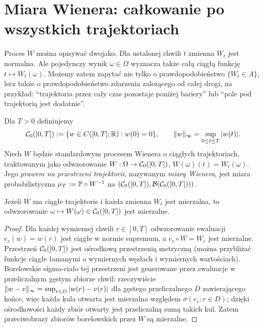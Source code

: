 \section{Miara Wienera: całkowanie po wszystkich trajektoriach}
Proces $W$ można opisywać dwojako. Dla ustalonej chwili $t$
zmienna $W_t$ jest normalna. Ale pojedynczy wynik
$\omega\in\Omega$ wyznacza także całą ciągłą funkcję
$t\mapsto W_t(\omega)$. Możemy zatem zapytać nie tylko
o prawdopodobieństwo $\{W_t\in A\}$, lecz także o
prawdopodobieństwo zdarzenia zależącego od całej drogi,
na przykład: ``trajektoria przez cały czas pozostaje
poniżej bariery'' lub ``pole pod trajektorią jest dodatnie''.

\begin{definicja}
Dla $T>0$ definiujemy
\[
\mathcal{C}_0([0,T]):=\{w\in C([0,T];\mathbb{R}):w(0)=0\},
\qquad \lVert w\rVert_\infty=\sup_{0\le t\le T}|w(t)|.
\]
Niech $W$ będzie standardowym procesem Wienera o ciągłych
trajektoriach, traktowanym jako odwzorowanie
$W:\Omega\to\mathcal{C}_0([0,T])$,
$W(\omega)(t)=W_t(\omega)$.
Jego \emph{prawem na przestrzeni trajektorii}, nazywanym
\emph{miarą Wienera}, jest miara probabilistyczna
$\mu_T:=\mathbb{P}\circ W^{-1}$ na
$(\mathcal{C}_0([0,T]),\mathcal{B}(\mathcal{C}_0([0,T])))$.
\end{definicja}

\begin{stwierdzenie}
Jeżeli $W$ ma ciągłe trajektorie i każda zmienna $W_t$
jest mierzalna, to odwzorowanie
$\omega\mapsto W(\omega)\in\mathcal{C}_0([0,T])$ jest mierzalne.
\end{stwierdzenie}
\begin{proof}
Dla każdej wymiernej chwili $r\in[0,T]$ odwzorowanie
ewaluacji $e_r(w)=w(r)$ jest ciągłe w normie supremum,
a $e_r\circ W=W_r$ jest mierzalne.
Przestrzeń $\mathcal{C}_0([0,T])$ jest ośrodkową przestrzenią
metryczną (można przybliżać funkcje ciągłe łamanymi
o wymiernych węzłach i wymiernych wartościach).
Borelowskie sigma-ciało tej przestrzeni jest generowane
przez ewaluacje w przeliczalnym gęstym zbiorze chwil:
rzeczywiście $\lVert w-v\rVert_\infty=\sup_{r\in D}|w(r)-v(r)|$
dla gęstego przeliczalnego $D$ zawierającego końce,
więc każda kula otwarta jest mierzalna względem
$\sigma(e_r:r\in D)$; dzięki ośrodkowości każdy zbiór
otwarty jest przeliczalną sumą takich kul.
Zatem przeciwobrazy zbiorów borelowskich przez $W$
są mierzalne.
\end{proof}

